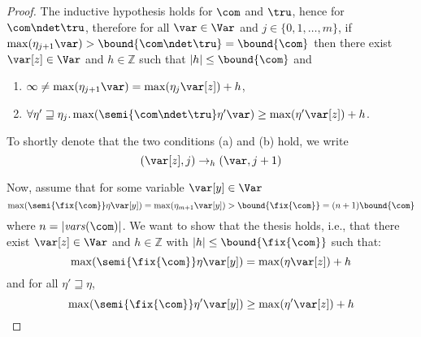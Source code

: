 \begin{proof}
  The inductive hypothesis holds for \(\com\) and \(\tru\), hence for
  \(\com \ndet \tru\), therefore for all \(\var \in \Var\) and
  \(j \in \{0,1, \ldots, m\}\), if \(\max(\eta_{j+1} \var) >\bound{\com\ndet \tru} =\bound{\com}\) then
  there exist \(\var[z] \in \Var\) and \(h \in \mathbb{Z}\) such that \(|h| \leq \bound{\com}\) and 
  \begin{enumerate}[label=(\alph*)]
  \item \(\infty \neq \max(\eta_{j+1} \var) = \max(\eta_j \var[z]) + h\),
  \item \(\forall \eta' \sqsupseteq \eta_j.
    \max(\semi{\com \ndet \tru}\eta'\var) \geq \max(\eta' \var[z]) + h\).
  \end{enumerate}
  To shortly denote that the two conditions (a) and (b) hold, we write
  \[
  (\var[z],j) \to_{h} (\var, j+1)
  \]
  
  Now, assume that for some variable \(\var[y] \in \Var\)
  \[\max(\semi{\fix{\com}} \eta \var[y]) = \max(\eta_{m+1} \var[y]) >
  \bound{\fix{\com}} = (n+1) \bound{\com}\]
  where \(n=|\mathit{vars}(\com)|\). 
  We want to show that the thesis holds, i.e., that there exist
  \(\var[z] \in \Var\) and \(h \in \mathbb{Z}\) with
  \(|h| \leq \bound{\fix{\com}}\) such that:
  \begin{equation}\label{eq:maxendmaxstartint}
    \max(\semi{\fix{\com}} \eta \var[y]) = \max(\eta \var[z]) + h
  \end{equation}
  and for all \(\eta' \sqsupseteq \eta\),
  \begin{equation}\label{eq:maxmiddlemaxendint}
    \max(\semi{\fix{\com}} \eta' \var[y]) \geq \max(\eta' \var[z]) + h
  \end{equation}
  

\end{proof}
